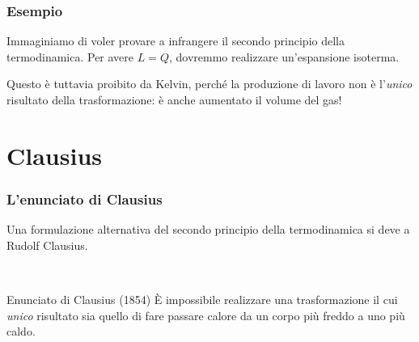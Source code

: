 \documentclass[]{beamer}
\theoremstyle{plain}
\begin{document}
\begin{frame}
\frametitle{Esempio}
Immaginiamo di voler provare a infrangere il secondo principio della termodinamica.{\pause}
Per avere $ L=Q $, dovremmo realizzare un'espansione isoterma.
  \begin{figure}\centering
{}
\end{figure} 
\pause
Questo è tuttavia proibito da Kelvin, perché la produzione di lavoro non è l'\emph{unico} risultato della trasformazione: è anche aumentato il volume del gas!
\end{frame}


\section{Clausius}

\begin{frame}
\frametitle{L'enunciato di Clausius}
Una formulazione alternativa del \alert{secondo principio della termodinamica} si deve a Rudolf Clausius.

~

\begin{block}{Enunciato di Clausius (1854)}
  È impossibile realizzare una trasformazione il cui \emph{unico} risultato sia quello di fare passare calore da un corpo più freddo a uno più caldo.
\end{block}
\end{frame}
\end{document}
